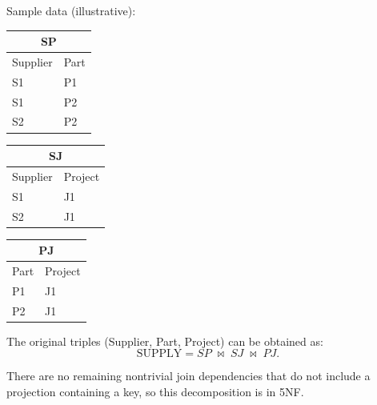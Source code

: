 \documentclass{article}
\begin{document}
Sample data (illustrative):

\begin{center}
\begin{tabular}{ll}
\toprule
\multicolumn{2}{c}{\textbf{SP}} \\
\midrule
Supplier & Part \\
\midrule
S1 & P1 \\
S1 & P2 \\
S2 & P2 \\
\bottomrule
\end{tabular}
\hspace{1.5em}
\begin{tabular}{ll}
\toprule
\multicolumn{2}{c}{\textbf{SJ}} \\
\midrule
Supplier & Project \\
\midrule
S1 & J1 \\
S2 & J1 \\
\bottomrule
\end{tabular}
\hspace{1.5em}
\begin{tabular}{ll}
\toprule
\multicolumn{2}{c}{\textbf{PJ}} \\
\midrule
Part & Project \\
\midrule
P1 & J1 \\
P2 & J1 \\
\bottomrule
\end{tabular}
\end{center}

The original triples (Supplier, Part, Project) can be obtained as:
\[
\text{SUPPLY} = SP \;\Join\; SJ \;\Join\; PJ.
\]

There are no remaining nontrivial join dependencies that do not include
a projection containing a key, so this decomposition is in 5NF.
\end{document}
